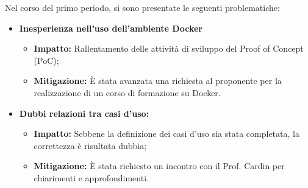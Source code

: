 \documentclass{article}
\begin{document}
Nel corso del primo periodo, si sono presentate le seguenti problematiche:
\begin{itemize}
    \item \textbf{Inesperienza nell'uso dell'ambiente Docker}
    \begin{itemize}
        \item \textbf{Impatto:} Rallentamento delle attività di sviluppo del Proof of Concept (PoC);
        \item \textbf{Mitigazione:}  È stata avanzata una richiesta al proponente per la realizzazione di un corso di formazione su Docker.
    \end{itemize}
    \item \textbf{Dubbi relazioni tra casi d'uso:}
    \begin{itemize}
        \item \textbf{Impatto:} Sebbene la definizione dei casi d'uso sia stata completata, la correttezza è risultata dubbia;
        \item \textbf{Mitigazione:} È stata richiesto un incontro con il Prof. Cardin per chiarimenti e approfondimenti.
\end{itemize}
\end{itemize}
\end{document}
